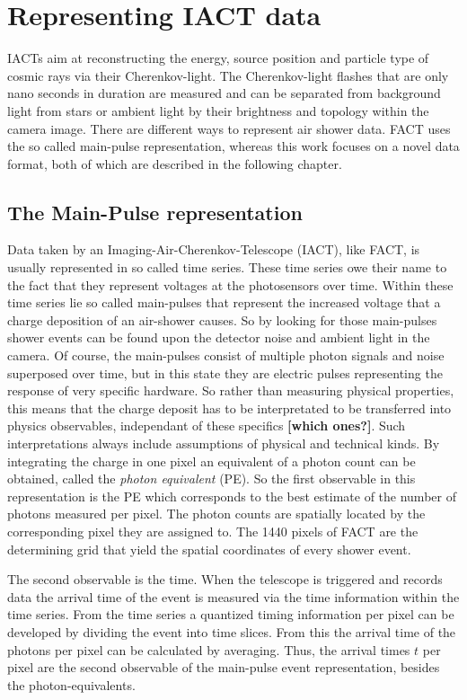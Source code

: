 \chapter{Representing IACT data}
%
IACTs aim at reconstructing the energy, source position and particle type of
cosmic rays via their Cherenkov-light. The Cherenkov-light flashes that are
only nano seconds in duration are measured and can be separated from background
light from stars or ambient light by their brightness and topology within the
camera image. There are different ways to represent air shower data. FACT uses
the so called main-pulse representation, whereas this work focuses on a novel
data format, both of which are described in the following chapter.

\section{The Main-Pulse representation}
%
Data taken by an Imaging-Air-Cherenkov-Telescope
(IACT), like FACT, is usually represented in so called time series.
These time series owe their name to the fact that they represent voltages at the photosensors over time. Within these time series lie so called main-pulses that represent the increased voltage that a charge deposition of an air-shower causes. So by looking for those main-pulses shower events can be found upon the detector noise and ambient light in the camera. Of course, the main-pulses consist of multiple photon signals and noise superposed over time, but in this state they are electric pulses representing the response of very specific hardware. So rather than measuring physical properties, this means that the charge deposit has to be interpretated to be transferred into physics observables, independant of these specifics \textbf{[which ones?]}. Such interpretations always include assumptions of physical and technical kinds. By integrating the charge in one pixel an equivalent of a photon count can be obtained, called the \textit{photon equivalent} (PE). So the first observable in this representation is the PE which corresponds to the best estimate of the number of photons measured per pixel. The photon counts are spatially located by the corresponding pixel they are assigned to. The 1440 pixels of FACT are the determining grid that yield the spatial coordinates of every shower event.

The second observable is the time. When the telescope is triggered and records
data the arrival time of the event is measured via the time information within
the time series. From the time series a quantized timing information per pixel
can be developed by dividing the event into time slices. From this the arrival
time of the photons per pixel can be calculated by averaging. Thus, the arrival
times $t$ per pixel are the second observable of the main-pulse event
representation, besides the photon-equivalents.

